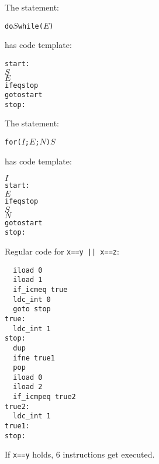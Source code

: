



\newcommand{\mm}[1]{$#1$}

\begin{slide*}
The statement:
 
\begin{scriptsize}
\begin{alltt}
     do \mm{S} while (\mm{E})
\end{alltt}
\end{scriptsize}
 
has code template:
 
\begin{scriptsize}
\begin{alltt}
    start:
    \mm{S}
    \mm{E}
    ifeq stop
    goto start
    stop:
\end{alltt}
\end{scriptsize}
\vfil
\end{slide*}

\begin{slide*}
The statement:
 
\begin{scriptsize}
\begin{alltt}
     for(\mm{I};\mm{E};\mm{N}) \mm{S}
\end{alltt}
\end{scriptsize}
 
has code template:
 
\begin{scriptsize}
\begin{alltt}
    \mm{I}
    start:
    \mm{E}
    ifeq stop
    \mm{S}
    \mm{N}
    goto start
    stop:
\end{alltt}
\end{scriptsize}
\vfil
\end{slide*}

\begin{slide*}
Regular code for \verb$x==y || x==z$:

\begin{scriptsize}
\begin{verbatim}
  iload 0
  iload 1
  if_icmeq true
  ldc_int 0
  goto stop
true:
  ldc_int 1
stop:
  dup
  ifne true1
  pop
  iload 0
  iload 2
  if_icmpeq true2
true2:
  ldc_int 1
true1:
stop:  
\end{verbatim}
\end{scriptsize}
If \verb$x==y$ holds, 6 instructions get executed.

\vfil
\end{slide*}

